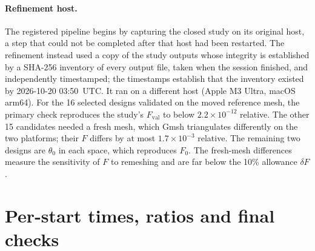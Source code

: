 \documentclass{anvil-paper}
\begin{document}
\paragraph{Refinement host.}
The registered pipeline begins by capturing the closed study on its
original host, a step that could not be completed after that host had been
restarted. The refinement instead used a copy of the study outputs whose
integrity is established by a SHA-256 inventory of every output file, taken
when the session finished, and independently timestamped; the timestamps
establish that the inventory existed by 2026-10-20 03:50~UTC. It ran on a different host (Apple M3 Ultra,
macOS arm64). For the 16 selected designs validated on the moved reference
mesh, the primary check reproduces the study's $F_{\mathrm{val}}$ to below
$2.2\times10^{-12}$ relative. The other 15 candidates needed a fresh mesh,
which Gmsh triangulates differently on the two platforms; their $F$
differs by at most $1.7\times10^{-3}$ relative. The remaining two designs
are $\theta_0$ in each space, which reproduces $F_0$. The fresh-mesh
differences measure the sensitivity of $F$ to remeshing and are far below
the 10\% allowance $\delta F$.


\section{Per-start times, ratios and final checks}\label{sec:exp2-times}
\begin{table}[H]\centering\small
\caption{Charged wall-time units to the first attaining validation,
repeat~1. A dash means the target was not attained within 120 units.
$T_{99}$ was attained by no run in space A.}
\label{tab:exp2-time}
\end{table}

\begin{table}[H]\centering\small
\caption{Paired per-start time ratios (repeat~1). B/A and D/E vary the
optimizer at fixed resolution; E/A and D/B vary the resolution; D/A
compares A with the coarse derivative-free competitor. Ratios above one
favor the denominator. Geometric means use the finite pairs only, so the
D/E and E/A means omit the starts where E failed to attain the target.}
\label{tab:exp2-ratios}
\end{table}

\begin{table}[H]\centering\scriptsize
\caption{Final checks of the selected designs. ``best'' marks a method's
representative; ``A $T_{90}$'' marks the earliest repeat-1 crossing of that
target by that method. The L2 column is the primary check on the
refinement host. L3 and conforming changes are in percent; the 40-angle,
tight and shifted changes are relative, in units of $10^{-4}$. ``held-out'' is the objective at currents $0.25$ and
$0.75$ relative to $\theta_0$'s at the same currents. A dash means the
conforming check does not apply because stator offsets are nonzero.}
\label{tab:exp2-refinement}
\end{table}
\end{document}
